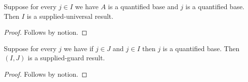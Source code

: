 

\begin{theorem}\label{supplied_imported_projection}
    Suppose for every $j\in I$ we have $A$ is a quantified base and $j$ is a quantified base.
    Then $I$ is a supplied-universal result.
\end{theorem}
\begin{proof}
    Follows by notion.
\end{proof}

\begin{theorem}\label{supplied_imported_guard_blocks}
    Suppose for every $j$ we have if $j\in J$ and $j\in I$ then $j$ is a quantified base.
    Then $(I,J)$ is a supplied-guard result.
\end{theorem}
\begin{proof}
    Follows by notion.
\end{proof}


